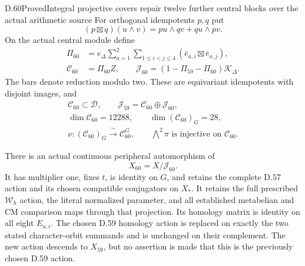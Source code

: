 \begin{statement}{D.60}{Proved}{Integral projective covers repair twelve further central blocks over the actual arithmetic source}
For orthogonal idempotents \(p,q\) put
\[
 (p\boxtimes q)(u\wedge v)
       =pu\wedge qv+qu\wedge pv.
\]
On the actual central module define
\[
 \begin{aligned}
 \Pi_{60}&=e_\Delta
        \sum_{a=1}^{2}\sum_{1\leq i<j\leq4}
                    (\bar e_{a,i}\boxtimes\bar e_{a,j}),\\
 \mathcal C_{60}&=\Pi_{60}Z,\qquad
 \mathcal J_{60}=(1-\Pi_{59}-\Pi_{60})\mathcal K_\Delta.
 \end{aligned}
 \tag{D.60.5}
\]
The bars denote reduction modulo two.
These are equivariant idempotents with disjoint
images, and
\[
 \begin{gathered}
 \mathcal C_{60}\subset\mathcal D,
 \qquad \mathcal J_{59}=\mathcal C_{60}\oplus\mathcal J_{60},\\
 \dim\mathcal C_{60}=12288,
 \qquad\dim(\mathcal C_{60})_G=28,\\
 \nu:(\mathcal C_{60})_G\xrightarrow{\ \sim\ }
                                  \mathcal C_{60}^{G},
 \qquad
 \bigwedge^2\pi\text{ is injective on }\mathcal C_{60}.
 \end{gathered}
 \tag{D.60.6}
\]

There is an actual continuous peripheral
automorphism of
\[
                         X_{60}=X/\mathcal J_{60}.
 \tag{D.60.7}
\]
It has multiplier one, fixes \(t\), is identity
on \(G\), and retains the complete D.57 action
and its chosen compatible conjugators on
\(X_*\). It retains the full prescribed
\(\mathcal W_h\) action, the literal normalized
parameter, and all established metabelian and
CM comparison maps through that projection.
Its homology matrix is identity on all eight
\(E_{a,i}\). The chosen D.59 homology action
is replaced on exactly the two stated
character-orbit summands and is unchanged
on their complement. The new action descends
to \(X_{59}\), but no assertion is made that
this is the previously chosen D.59 action.


\end{statement}
